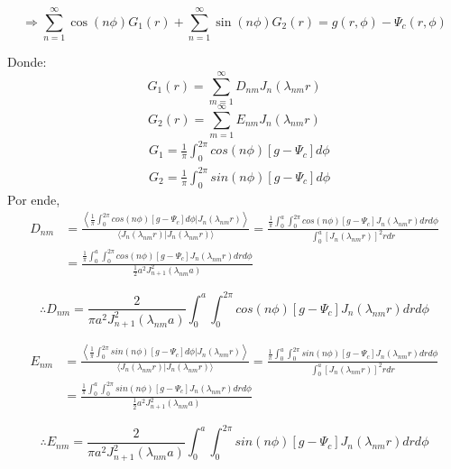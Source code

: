 \documentclass{article}
\begin{document}
$$\Rightarrow \sum_{n=1}^{\infty} \cos(n\phi)G_1(r)
+\sum_{n=1}^{\infty} \sin(n\phi)G_2(r)=g(r,\phi)-\Psi_c(r,\phi)$$

Donde:
$$G_1(r)=\sum_{m=1}^{\infty} D_{nm} J_n(\lambda_{nm}r)$$ 
$$G_2(r)=\sum_{m=1}^{\infty} E_{nm} J_n(\lambda_{nm}r)$$
\begin{equation*}
\begin{split}
&G_1=\frac{1}{\pi}\int_0^{2\pi} cos(n\phi)[g-\Psi_c]d\phi\\
&G_2=\frac{1}{\pi}\int_0^{2\pi} sin(n\phi)[g-\Psi_c]d\phi
\end{split}
\end{equation*}
Por ende,
\begin{equation}
\begin{split}
D_{nm}&=\frac{\left< \frac{1}{\pi} \int_{0}^{2\pi} cos(n\phi)[g-\Psi_c]d\phi | J_n(\lambda_{nm}r) \right> }{\langle J_n(\lambda_{nm}r) | J_n(\lambda_{nm}r) \rangle} = \frac{\frac{1}{\pi} \int_0^a \int_0^{2\pi} cos(n\phi)[g-\Psi_c] J_n(\lambda_{nm}r) drd\phi }{\int_0^a [J_n(\lambda_{nm}r)]^2 rdr }\\
&=\frac{\frac{1}{\pi} \int_0^a \int_0^{2\pi} cos(n\phi)[g-\Psi_c] J_n(\lambda_{nm}r) drd\phi }{ \frac{1}{2}a^2 J_{n+1}^2 (\lambda_{nm}a) }
\end{split}
\end{equation}
\begin{tcolorbox}
$$\therefore D_{nm}=\frac{2}{\pi a^2 J_{n+1}^2 (\lambda_{nm}a)} \int_0^a \int_0^{2\pi} cos(n\phi)[g-\Psi_c] J_n(\lambda_{nm}r) drd\phi $$
\end{tcolorbox}

\begin{equation}
\begin{split}
E_{nm}&=\frac{\left< \frac{1}{\pi} \int_{0}^{2\pi} sin(n\phi)[g-\Psi_c]d\phi | J_n(\lambda_{nm}r) \right> }{\langle J_n(\lambda_{nm}r) | J_n(\lambda_{nm}r) \rangle} = \frac{\frac{1}{\pi} \int_0^a \int_0^{2\pi} sin(n\phi)[g-\Psi_c] J_n(\lambda_{nm}r) drd\phi }{\int_0^a [J_n(\lambda_{nm}r)]^2 rdr }\\
&=\frac{\frac{1}{\pi} \int_0^a \int_0^{2\pi} sin(n\phi)[g-\Psi_c] J_n(\lambda_{nm}r) drd\phi }{ \frac{1}{2}a^2 J_{n+1}^2 (\lambda_{nm}a) }
\end{split}
\end{equation}
\begin{tcolorbox}
$$\therefore E_{nm}=\frac{2}{\pi a^2 J_{n+1}^2 (\lambda_{nm}a)} \int_0^a \int_0^{2\pi} sin(n\phi)[g-\Psi_c] J_n(\lambda_{nm}r) drd\phi $$
\end{tcolorbox}
\end{document}

